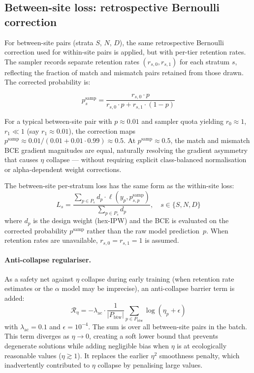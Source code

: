 \documentclass{article}
\begin{document}
\subsection{Between-site loss: retrospective Bernoulli correction}
\label{sec:between-loss}

For between-site pairs (strata $S$, $N$, $D$), the same retrospective Bernoulli correction used for within-site pairs is applied, but with per-tier retention rates. The sampler records separate retention rates $(r_{s,0}, r_{s,1})$ for each stratum $s$, reflecting the fraction of match and mismatch pairs retained from those drawn. The corrected probability is:

\begin{equation}
    p_s^{\text{samp}} = \frac{r_{s,0} \cdot p}{r_{s,0} \cdot p + r_{s,1} \cdot (1-p)}
\end{equation}

For a typical between-site pair with $p \approx 0.01$ and sampler quota yielding $r_0 \approx 1$, $r_1 \ll 1$ (say $r_1 \approx 0.01$), the correction maps $p^{\text{samp}} \approx 0.01/(0.01 + 0.01 \cdot 0.99) \approx 0.5$. At $p^{\text{samp}} \approx 0.5$, the match and mismatch BCE gradient magnitudes are equal, naturally resolving the gradient asymmetry that causes $\eta$ collapse --- without requiring explicit class-balanced normalisation or alpha-dependent weight corrections.

The between-site per-stratum loss has the same form as the within-site loss:
\begin{equation}
    L_s = \frac{\sum_{p \in P_s} d_p \cdot \ell(y_p, p_{s,p}^{\text{samp}})}{\sum_{p \in P_s} d_p}, \quad s \in \{S, N, D\}
\end{equation}
where $d_p$ is the design weight (hex-IPW) and the BCE is evaluated on the corrected probability $p^{\text{samp}}$ rather than the raw model prediction~$p$. When retention rates are unavailable, $r_{s,0} = r_{s,1} = 1$ is assumed.

\paragraph{Anti-collapse regulariser.} As a safety net against $\eta$ collapse during early training (when retention rate estimates or the $\alpha$ model may be imprecise), an anti-collapse barrier term is added:
\begin{equation}
    \mathcal{R}_\eta = -\lambda_{\text{ac}} \cdot \frac{1}{|P_{\text{btw}}|} \sum_{p \in P_{\text{btw}}} \log(\eta_p + \epsilon)
\end{equation}
with $\lambda_{\text{ac}} = 0.1$ and $\epsilon = 10^{-4}$. The sum is over all between-site pairs in the batch. This term diverges as $\eta \to 0$, creating a soft lower bound that prevents degenerate solutions while adding negligible bias when $\eta$ is at ecologically reasonable values ($\eta \gtrsim 1$). It replaces the earlier $\eta^2$ smoothness penalty, which inadvertently contributed to $\eta$ collapse by penalising large values.
\end{document}
